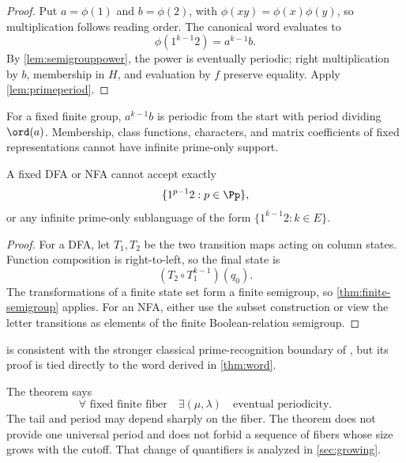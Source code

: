 \begin{proof}
Put \(a=\phi(1)\) and \(b=\phi(2)\), with
\(\phi(xy)=\phi(x)\phi(y)\), so multiplication follows reading order.  The
canonical word evaluates to
\[
        \phi(1^{k-1}2)=a^{k-1}b.
\]
By \cref{lem:semigrouppower}, the power is eventually periodic; right
multiplication by \(b\), membership in \(H\), and evaluation by \(f\)
preserve equality.  Apply \cref{lem:primeperiod}.
\end{proof}

\begin{corollary}
\label{cor:finitegroup}
For a fixed finite group, \(a^{k-1}b\) is periodic from the start with
period dividing \(\ord(a)\).  Membership, class functions, characters, and
matrix coefficients of fixed representations cannot have infinite
prime-only support.
\end{corollary}

\begin{theorem}
\label{thm:automata}
A fixed DFA or NFA cannot accept exactly
\[
        \{1^{p-1}2:p\in\Pp\},
\]
or any infinite prime-only sublanguage of the form
\(\{1^{k-1}2:k\in E\}\).
\end{theorem}

\begin{proof}
For a DFA, let \(T_1,T_2\) be the two transition maps acting on column
states.  Function composition is right-to-left, so the final state is
\[
        (T_2\circ T_1^{k-1})(q_0).
\]
The transformations of a finite state set form a finite semigroup, so
\cref{thm:finite-semigroup} applies.  For an NFA, either use the subset
construction or view the letter transitions as elements of the finite
Boolean-relation semigroup.
\end{proof}

 is consistent with the stronger classical
prime-recognition boundary of \citet{HartmanisShank1968}, but its proof is
tied directly to the word derived in \cref{thm:word}.

\begin{remark}[Quantifiers]
\label{rem:quantifiers}
The theorem says
\[
 \forall\text{ fixed finite fiber}\quad
 \exists(\mu,\lambda)\quad
 \text{eventual periodicity}.
\]
The tail and period may depend sharply on the fiber.  The theorem does not
provide one universal period and does not forbid a sequence of fibers whose
size grows with the cutoff.  That change of quantifiers is analyzed in
\cref{sec:growing}.
\end{remark}

